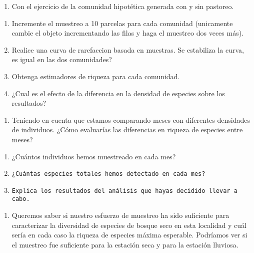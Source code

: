 \documentclass[]{book}
\providecommand{\tightlist}{%
  \setlength{\itemsep}{0pt}\setlength{\parskip}{0pt}}
\begin{document}
\begin{enumerate}
\def\labelenumi{\arabic{enumi}.}
\tightlist
\item
  Con el ejercicio de la comunidad hipotética generada con y sin
  pastoreo.
\end{enumerate}

\begin{enumerate}
\def\labelenumi{\alph{enumi}.}
\tightlist
\item
  Incremente el muestreo a 10 parcelas para cada comunidad (unicamente
  cambie el objeto incrementando las filas y haga el muestreo dos veces
  más).
\item
  Realice una curva de rarefaccion basada en muestras. Se estabiliza la
  curva, es igual en las dos comunidades?
\item
  Obtenga estimadores de riqueza para cada comunidad.
\item
  ¿Cual es el efecto de la diferencia en la densidad de especies sobre
  los resultados?
\end{enumerate}

\begin{enumerate}
\def\labelenumi{\arabic{enumi}.}
\setcounter{enumi}{1}
\tightlist
\item
  Teniendo en cuenta que estamos comparando meses con diferentes
  densidades de individuos. ¿Cómo evaluarías las diferencias en riqueza
  de especies entre meses?
\end{enumerate}

\begin{enumerate}
\def\labelenumi{\alph{enumi}.}
\item
  ¿Cuántos individuos hemos muestreado en cada mes?
\item
\begin{verbatim}
¿Cuántas especies totales hemos detectado en cada mes?
\end{verbatim}
\item
\begin{verbatim}
Explica los resultados del análisis que hayas decidido llevar a cabo.
\end{verbatim}
\end{enumerate}

\begin{enumerate}
\def\labelenumi{\arabic{enumi}.}
\setcounter{enumi}{2}
\tightlist
\item
  Queremos saber si nuestro esfuerzo de muestreo ha sido suficiente para
  caracterizar la diversidad de especies de bosque seco en esta
  localidad y cuál sería en cada caso la riqueza de especies máxima
  esperable. Podríamos ver si el muestreo fue suficiente para la
  estación seca y para la estación lluviosa.
\end{enumerate}
\end{document}
